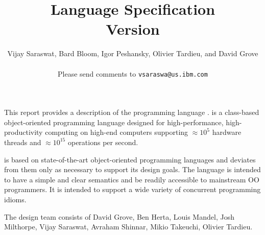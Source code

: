 
\thispagestyle{empty}


\title{ \Xten Language Specification \\
\large Version \integerversion}
\author{Vijay Saraswat, Bard Bloom, Igor Peshansky, Olivier Tardieu, and David Grove\\
\\
Please send comments to 
\texttt{vsaraswa@us.ibm.com}}

\maketitle

\newcommand\authorsc[1]{#1}

This report provides a description of the programming
language \Xten. \Xten{} is a class-based object-oriented
programming language designed for high-performance, high-productivity
computing on high-end computers supporting $\approx 10^5$ hardware threads
and $\approx 10^{15}$ operations per second. 

\Xten{} is based on state-of-the-art object-oriented programming
languages and deviates from them only as necessary to support its
design goals. The language is intended to have a simple and clear
semantics and be readily accessible to mainstream OO programmers. It
is intended to support a wide variety of concurrent programming
idioms.


The \Xten{} design team consists of
\authorsc{David Grove},
\authorsc{Ben Herta},
\authorsc{Louis Mandel},
\authorsc{Josh Milthorpe},
\authorsc{Vijay Saraswat},
\authorsc{Avraham Shinnar},
\authorsc{Mikio Takeuchi},
\authorsc{Olivier Tardieu}.


